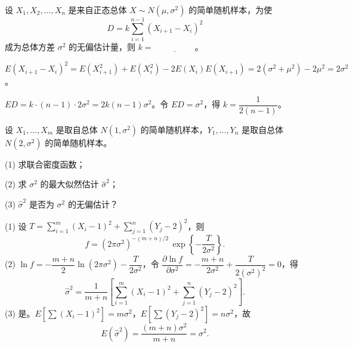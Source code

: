 \documentclass[lang=cn,11pt]{elegantbook}
\begin{document}
\begin{exercise}\label{exer:7-unbiased-diff}
设 \(X_1, X_2, \dots, X_n\) 是来自正态总体 \(X \sim N(\mu, \sigma^2)\) 的简单随机样本，为使
\[
D = k\sum_{i=1}^{n-1}(X_{i+1}-X_i)^2
\]
成为总体方差 \(\sigma^2\) 的无偏估计量，则 \(k =\,\underline{\hspace{2cm}}\)。
\end{exercise}
\begin{solution}
\(E(X_{i+1}-X_i)^2 = E(X_{i+1}^2) + E(X_i^2) - 2E(X_i)E(X_{i+1}) = 2(\sigma^2+\mu^2) - 2\mu^2 = 2\sigma^2\)。

\(ED = k\cdot(n-1)\cdot 2\sigma^2 = 2k(n-1)\sigma^2\)。令 \(ED = \sigma^2\)，得 \(k = \dfrac{1}{2(n-1)}\)。
\end{solution}




\begin{exercise}\label{exer:7-two-normal-mle}
设 \(X_1, \dots, X_m\) 是取自总体 \(N(1, \sigma^2)\) 的简单随机样本，\(Y_1, \dots, Y_n\) 是取自总体 \(N(2, \sigma^2)\) 的简单随机样本。\par
(1) 求联合密度函数；\par
(2) 求 \(\sigma^2\) 的最大似然估计 \(\hat{\sigma}^2\)；\par
(3) \(\hat{\sigma}^2\) 是否为 \(\sigma^2\) 的无偏估计？
\end{exercise}
\begin{solution}
(1) 设 \(T = \displaystyle\sum_{i=1}^{m}(X_i-1)^2 + \sum_{j=1}^{n}(Y_j-2)^2\)，则
\[
f = (2\pi\sigma^2)^{-(m+n)/2}\,\exp\!\left\{-\frac{T}{2\sigma^2}\right\}.
\]
(2) \(\ln f = -\dfrac{m+n}{2}\ln(2\pi\sigma^2) - \dfrac{T}{2\sigma^2}\)，令 \(\dfrac{\partial\ln f}{\partial\sigma^2} = -\dfrac{m+n}{2\sigma^2}+\dfrac{T}{2(\sigma^2)^2}=0\)，得
\[
\hat{\sigma}^2 = \frac{1}{m+n}\!\left[\sum_{i=1}^{m}(X_i-1)^2+\sum_{j=1}^{n}(Y_j-2)^2\right].
\]
(3) 是。\(E\!\left[\sum(X_i-1)^2\right] = m\sigma^2\)，\(E\!\left[\sum(Y_j-2)^2\right] = n\sigma^2\)，故
\[
E(\hat{\sigma}^2) = \frac{(m+n)\sigma^2}{m+n} = \sigma^2. 
\]
\end{solution}
\end{document}
